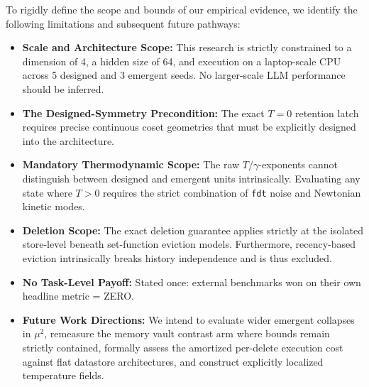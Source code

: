 \documentclass{article}
\begin{document}
To rigidly define the scope and bounds of our empirical evidence, we identify the following limitations and subsequent future pathways:
\begin{itemize}
    \item \textbf{Scale and Architecture Scope:} This research is strictly constrained to a dimension of 4, a hidden size of 64, and execution on a laptop-scale CPU across 5 designed and 3 emergent seeds. No larger-scale LLM performance should be inferred.
    \item \textbf{The Designed-Symmetry Precondition:} The exact $T=0$ retention latch requires precise continuous coset geometries that must be explicitly designed into the architecture.
    \item \textbf{Mandatory Thermodynamic Scope:} The raw $T/\gamma$-exponents cannot distinguish between designed and emergent units intrinsically. Evaluating any state where $T>0$ requires the strict combination of \texttt{fdt} noise and Newtonian kinetic modes.
    \item \textbf{Deletion Scope:} The exact deletion guarantee applies strictly at the isolated store-level beneath set-function eviction models. Furthermore, recency-based eviction intrinsically breaks history independence and is thus excluded.
    \item \textbf{No Task-Level Payoff:} Stated once: external benchmarks won on their own headline metric = ZERO.
    \item \textbf{Future Work Directions:} We intend to evaluate wider emergent collapses in $\mu^2$, remeasure the memory vault contrast arm where bounds remain strictly contained, formally assess the amortized per-delete execution cost against flat datastore architectures, and construct explicitly localized temperature fields.
\end{itemize}

\clearpage
\appendix
\end{document}
